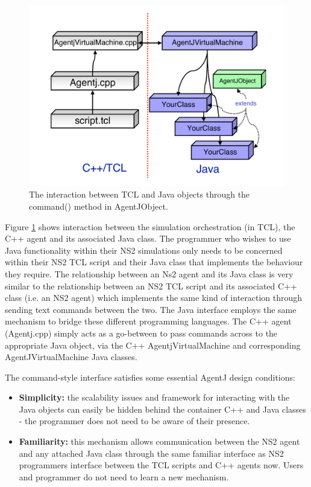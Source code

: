  \begin{figure}
 \centering
 \includegraphics[scale=0.4]{images/progoverview}
 \caption{The interaction between TCL and Java objects through the command() method in AgentJObject. }
 \label{fig:progoverview}
 \end{figure}


Figure \ref{fig:progoverview} shows interaction between the simulation orchestration (in TCL), the C++ agent and its associated Java class.  The programmer who wishes to use
 Java functionality within their NS2 simulations only needs to be
 concerned within their NS2 TCL script and their Java class that
 implements the behaviour they require. The relationship between an Ns2 agent
 and its Java class is very similar to the relationship between an NS2
 TCL script and its associated C++ class (i.e. an NS2 agent) which
 implements the same kind of interaction through sending text
 commands between the two. The Java interface
 employs the same mechanism to bridge these different
 programming languages. The C++ agent (Agentj.cpp) simply acts
 as a go-between to pass commands across to the
 appropriate Java object, via the C++ AgentjVirtualMachine and 
 corresponding AgentJVirtualMachine Java classes.

The command-style interface satisfies some essential AgentJ design conditions:

 \begin{itemize}
 \item  \textbf{Simplicity:} the scalability issues and framework for interacting with
 the Java objects can easily be hidden behind the container C++ and Java classes
 - the programmer does not need to be aware of their presence.
 \item  \textbf{Familiarity:} this mechanism allows communication between the
 NS2 agent and any attached Java class through the same familiar interface as NS2 programmers interface between the TCL scripts and C++ agents now. Users and programmer do not need to learn a new mechanism.
 \end{itemize}

